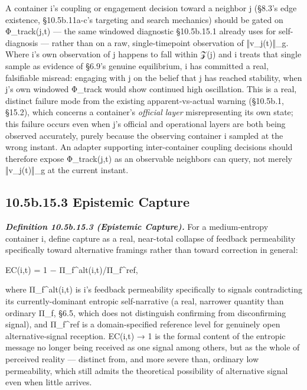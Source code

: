 \documentclass[
]{article}
\begin{document}
A container i's coupling or engagement decision toward a neighbor j
(§8.3's edge existence, §10.5b.11a-c's targeting and search mechanics)
should be gated on Φ\_track(j,t) --- the same windowed diagnostic
§10.5b.15.1 already uses for self-diagnosis --- rather than on a raw,
single-timepoint observation of ‖v\_j(t)‖\_g. Where i's own observation
of j happens to fall within 𝒵(j) and i treats that single sample as
evidence of §6.9's genuine equilibrium, i has committed a real,
falsifiable misread: engaging with j on the belief that j has reached
stability, when j's own windowed Φ\_track would show continued high
oscillation. This is a real, distinct failure mode from the existing
apparent-vs-actual warning (§10.5b.1, §15.2), which concerns a
container's \emph{official layer} misrepresenting its own state; this
failure occurs even when j's official and operational layers are both
being observed accurately, purely because the observing container i
sampled at the wrong instant. An adapter supporting inter-container
coupling decisions should therefore expose Φ\_track(j,t) as an
observable neighbors can query, not merely ‖v\_j(t)‖\_g at the current
instant.

\hypertarget{b.15.3-epistemic-capture}{%
\subsection{10.5b.15.3 Epistemic
Capture}\label{b.15.3-epistemic-capture}}

\emph{\textbf{Definition 10.5b.15.3 (Epistemic Capture).}} For a
medium-entropy container i, define capture as a real, near-total
collapse of feedback permeability specifically toward alternative
framings rather than toward correction in general:

EC(i,t) = 1 − Π\_f\^{}alt(i,t)/Π\_f\^{}ref,

where Π\_f\^{}alt(i,t) is i's feedback permeability specifically to
signals contradicting its currently-dominant entropic self-narrative (a
real, narrower quantity than ordinary Π\_f, §6.5, which does not
distinguish confirming from disconfirming signal), and Π\_f\^{}ref is a
domain-specified reference level for genuinely open alternative-signal
reception. EC(i,t) → 1 is the formal content of the entropic message no
longer being received as one signal among others, but as the whole of
perceived reality --- distinct from, and more severe than, ordinary low
permeability, which still admits the theoretical possibility of
alternative signal even when little arrives.
\end{document}

